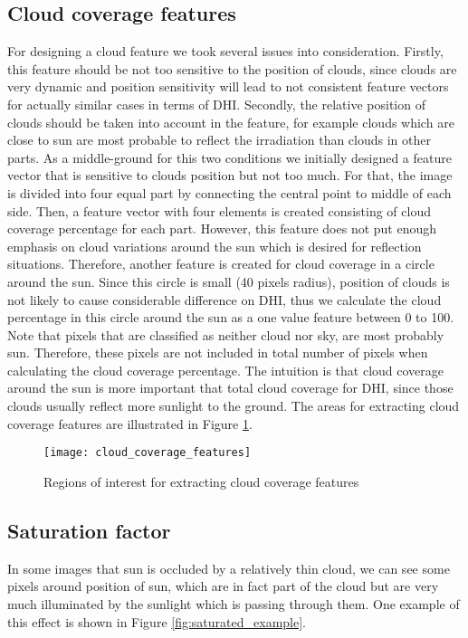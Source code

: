 \subsection{Cloud coverage features}
\label{sec:cc_around_sun}
For designing a cloud feature we took several issues into consideration. Firstly, this feature should be not too sensitive to the position of clouds, since clouds are very dynamic and position sensitivity will lead to not consistent feature vectors for actually similar cases in terms of DHI. Secondly, the relative position of clouds should be taken into account in the feature, for example clouds which are close to sun are most probable to reflect the irradiation than clouds in other parts. As a middle-ground for this two conditions we initially designed a feature vector that is sensitive to clouds position but not too much. For that, the image is divided into four equal part by connecting the central point to middle of each side. Then, a feature vector with four elements is created consisting of cloud coverage percentage for each part. However, this feature does not put enough emphasis on cloud variations around the sun which is desired for reflection situations. Therefore, another feature is created for cloud coverage in a circle around the sun. Since this circle is small (40 pixels radius), position of clouds is not likely to cause considerable difference on DHI, thus we calculate the cloud percentage in this circle around the sun as a one value feature between 0 to 100. Note that pixels that are classified as neither cloud nor sky, are most probably sun. Therefore, these pixels are not included in total number of pixels when calculating the cloud coverage percentage. The intuition is that cloud coverage around the sun is more important that total cloud coverage for DHI, since those clouds usually reflect more sunlight to the ground. The areas for extracting cloud coverage features are illustrated in Figure \ref{fig:cloud_coverage_features}.

\begin{figure}[h]
\caption{Regions of interest for extracting cloud coverage features}
\label{fig:cloud_coverage_features}
\texttt{[image: cloud\_coverage\_features]}
\centering
\end{figure}

\subsection{Saturation factor}
\label{sec:saturation}
In some images that sun is occluded by a relatively thin cloud, we can see some pixels around position of sun, which are in fact part of the cloud but are very much illuminated by the sunlight which is passing through them. One example of this effect is shown in Figure \ref{fig:saturated_example}. 

